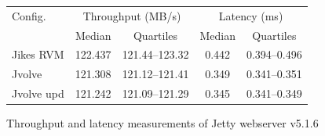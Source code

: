 \documentclass[9pt]{sigplanconf}
\newcommand{\DSU}{{\sc Jvolve}}
\newcommand{\JikesRVM}{Jikes RVM}
\newcommand\T{\rule{0pt}{2.0ex}}
\begin{document}
\begin{figure}[t]
\begin{small}
\begin{center}
\begin{tabular}{|l|c|c|c|c|} \hline \T
Config.                & \multicolumn{2}{c|}{Throughput (MB/s)}  & \multicolumn{2}{c|}{Latency (ms)} \\ \cline{2-5}
                       & Median   & Quartiles \T                 & Median & Quartiles                \\ \hline \T
\JikesRVM{}            & 122.437  & 121.44--123.32               & 0.442  & 0.394--0.496             \\
\DSU{}                 & 121.308  & 121.12--121.41               & 0.349  & 0.341--0.351             \\
\DSU{} upd             & 121.242  & 121.09--121.29               & 0.345  & 0.341--0.349             \\ \hline
\end{tabular}
\end{center}
\end{small}
\begin{center}
\caption{Throughput and latency measurements of Jetty webserver v5.1.6\label{fig:jetty}}
\end{center}
\end{figure}
\end{document}
